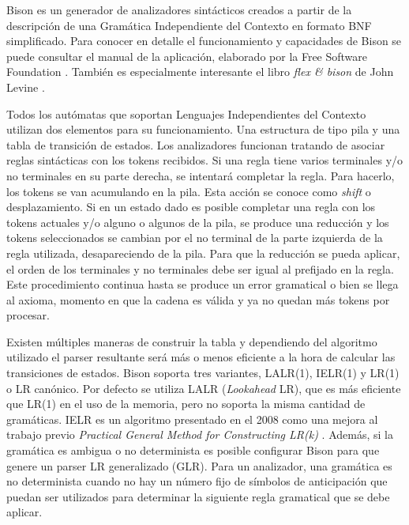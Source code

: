 Bison es un generador de analizadores sintácticos creados a partir de la descripción de una Gramática Independiente del Contexto en formato BNF simplificado. Para conocer en detalle el funcionamiento y capacidades de Bison se puede consultar el manual de la aplicación, elaborado por la Free Software Foundation
\cite{fsf_web_bisonManual}. También es especialmente interesante el libro \emph{flex \& bison} de John Levine \cite{levine_book_flexBison}.

\label{automatas-pila} Todos los autómatas que soportan Lenguajes Independientes del Contexto utilizan dos elementos para su funcionamiento. Una estructura de tipo pila y una tabla de transición de estados. Los analizadores funcionan tratando de asociar reglas sintácticas con los tokens recibidos. Si una regla tiene varios terminales y/o no terminales en su parte derecha, se intentará completar la regla. Para hacerlo, los tokens se van acumulando en la pila. Esta acción se conoce como \emph{shift} o desplazamiento. Si en un estado dado es posible completar una regla con los tokens actuales y/o alguno o algunos de la pila, se produce una reducción y los tokens seleccionados se cambian por el no terminal de la parte izquierda de la regla utilizada, desapareciendo de la pila. Para que la reducción se pueda aplicar, el orden de los terminales y no terminales debe ser igual al prefijado en la regla. Este procedimiento continua hasta se produce un error gramatical o bien se llega al axioma, momento en que la cadena es válida y ya no quedan más tokens por procesar.

Existen múltiples maneras de construir la tabla y dependiendo del algoritmo utilizado el parser resultante será más o menos eficiente a la hora de calcular las transiciones de estados. Bison soporta tres variantes, LALR(1), IELR(1) y LR(1) o LR canónico. Por defecto se utiliza LALR (\emph{Lookahead} LR), que es más eficiente que LR(1) en el uso de la memoria, pero no soporta la misma cantidad de gramáticas. IELR es un algoritmo presentado en el 2008 \cite{dennyMalloy_paper_IELRAlgorithm} como una mejora al trabajo previo \emph{Practical General Method for Constructing LR(k)} \cite{pager_paper_constructLRparsers}. Además, si la gramática es ambigua o no determinista es posible configurar Bison para que genere un parser LR generalizado (GLR). Para un analizador, una gramática es no determinista cuando no hay un número fijo de símbolos de anticipación que puedan ser utilizados para determinar la siguiente regla gramatical que se debe aplicar.


